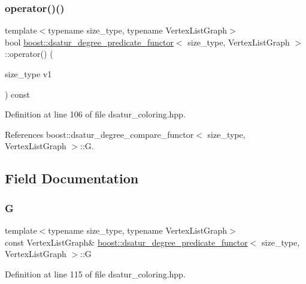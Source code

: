 \subsubsection{\texorpdfstring{operator()()}{operator()()}}
{\footnotesize\ttfamily template$<$typename size\+\_\+type, typename Vertex\+List\+Graph$>$ \\
bool \hyperlink{structboost_1_1dsatur__degree__predicate__functor}{boost\+::dsatur\+\_\+degree\+\_\+predicate\+\_\+functor}$<$ size\+\_\+type, Vertex\+List\+Graph $>$\+::operator() (\begin{DoxyParamCaption}\item[{size\+\_\+type}]{v1 }\end{DoxyParamCaption}) const\hspace{0.3cm}{\ttfamily [inline]}}



Definition at line 106 of file dsatur\+\_\+coloring.\+hpp.



References boost\+::dsatur\+\_\+degree\+\_\+compare\+\_\+functor$<$ size\+\_\+type, Vertex\+List\+Graph $>$\+::G.



\subsection{Field Documentation}
\mbox{\label{structboost_1_1dsatur__degree__predicate__functor_a6b40fb25549a91d2990a1865e8a6cca6}} 
\subsubsection{\texorpdfstring{G}{G}}
{\footnotesize\ttfamily template$<$typename size\+\_\+type, typename Vertex\+List\+Graph$>$ \\
const Vertex\+List\+Graph\& \hyperlink{structboost_1_1dsatur__degree__predicate__functor}{boost\+::dsatur\+\_\+degree\+\_\+predicate\+\_\+functor}$<$ size\+\_\+type, Vertex\+List\+Graph $>$\+::G\hspace{0.3cm}{\ttfamily [private]}}



Definition at line 115 of file dsatur\+\_\+coloring.\+hpp.

